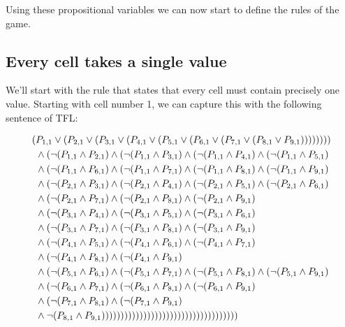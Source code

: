 \documentclass[10pt]{article}
\begin{document}
Using these propositional variables we can now start to define the rules of the game.

\subsection{Every cell takes a single value}

We'll start with the rule that states that every cell must contain precisely one value. Starting with cell number 1, we can capture this with the following sentence of TFL:

\begin{align*}
(&P_{1,1} \lor (P_{2,1} \lor (P_{3,1} \lor (P_{4,1} \lor (P_{5,1} \lor (P_{6,1} \lor (P_{7,1} \lor (P_{8,1} \lor P_{9,1})))))))) \\
& \land (\lnot(P_{1,1} \land P_{2,1}) \land (\lnot(P_{1,1} \land P_{3,1}) \land (\lnot(P_{1,1} \land P_{4,1}) \land (\lnot(P_{1,1} \land P_{5,1}) \\
& \land (\lnot(P_{1,1} \land P_{6,1}) \land (\lnot(P_{1,1} \land P_{7,1}) \land (\lnot(P_{1,1} \land P_{8,1}) \land (\lnot(P_{1,1} \land P_{9,1}) \\
& \land (\lnot(P_{2,1} \land P_{3,1}) \land (\lnot(P_{2,1} \land P_{4,1}) \land (\lnot(P_{2,1} \land P_{5,1}) \land (\lnot(P_{2,1} \land P_{6,1}) \\
& \land (\lnot(P_{2,1} \land P_{7,1}) \land (\lnot(P_{2,1} \land P_{8,1}) \land (\lnot(P_{2,1} \land P_{9,1}) \\
& \land (\lnot(P_{3,1} \land P_{4,1}) \land (\lnot(P_{3,1} \land P_{5,1}) \land (\lnot(P_{3,1} \land P_{6,1}) \\
& \land (\lnot(P_{3,1} \land P_{7,1}) \land (\lnot(P_{3,1} \land P_{8,1}) \land (\lnot(P_{3,1} \land P_{9,1}) \\
& \land (\lnot(P_{4,1} \land P_{5,1}) \land (\lnot(P_{4,1} \land P_{6,1}) \land (\lnot(P_{4,1} \land P_{7,1}) \\
& \land (\lnot(P_{4,1} \land P_{8,1}) \land (\lnot(P_{4,1} \land P_{9,1}) \\
& \land (\lnot(P_{5,1} \land P_{6,1}) \land (\lnot(P_{5,1} \land P_{7,1}) \land (\lnot(P_{5,1} \land P_{8,1}) \land (\lnot(P_{5,1} \land P_{9,1}) \\
& \land (\lnot(P_{6,1} \land P_{7,1}) \land (\lnot(P_{6,1} \land P_{8,1}) \land (\lnot(P_{6,1} \land P_{9,1}) \\
& \land (\lnot(P_{7,1} \land P_{8,1}) \land (\lnot(P_{7,1} \land P_{9,1}) \\
& \land \lnot(P_{8,1} \land P_{9,1}))))))))))))))))))))))))))))))))))))
\end{align*}
\end{document}

